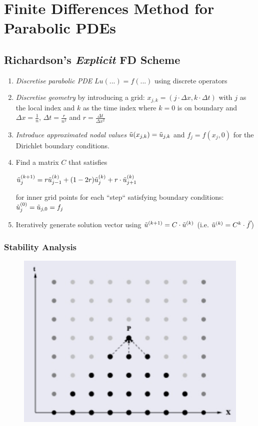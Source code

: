 \section{Finite Differences Method for Parabolic PDEs}

\subsection{Richardson's \emph{Explicit} FD Scheme}

\begin{enumerate}
	\item \emph{Discretise parabolic PDE} $Lu(...) = f(...)$ using discrete operators
	\item{
		\emph{Discretise geometry} by introducing a grid:
		$x_{j,k} = (j\cdot\Delta x, k\cdot\Delta t)$ with $j$ as the local index
		and $k$ as the time index where $k=0$ is on boundary
		and \colorbox{shadecolor}{$\Delta x = \frac{1}{n}$},
		\colorbox{shadecolor}{$\Delta t = \frac{r}{n^2}$}
		and \colorbox{shadecolor}{$r = \frac{\Delta t}{\Delta x^2}$}
	}
	\item{
		\emph{Introduce approximated nodal values} $\tilde{u}(x_{j,k}) = \tilde{u}_{j,k}$ and $f_j = f(x_j,0)$ for the Dirichlet boundary conditions.
	}
	\item{
		Find a matrix $C$ that satisfies

		\colorbox{shadecolor}{$
			\displaystyle
			\tilde{u}_{j}^{(k+1)}=r\tilde{u}_{j-1}^{(k)}+(1-2r)\tilde{u}_{j}^{(k)} + r\cdot \tilde{u}_{j+1}^{(k)}
		$}

		for inner grid points for each ``step`` satisfying boundary conditions: $\tilde{u}_{j}^{(0)}=\tilde{u}_{j,0}=f_j$
	}
	\item{
		Iteratively generate solution vector using $\tilde{u}^{(k+1)}=C\cdot\tilde{u}^{(k)}$
		(i.e. $\tilde{u}^{(k)} = C^k\cdot \vec{f}$)
	}
\end{enumerate}

\subsubsection{Stability Analysis}

\begin{figure}
	\includegraphics[width=0.25\columnwidth]{images/richardsons}
\end{figure}

